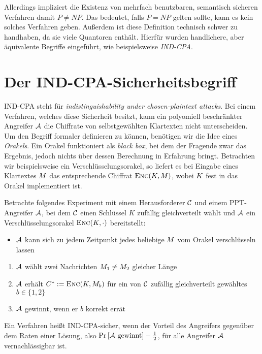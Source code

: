 Allerdings impliziert die Existenz von mehrfach benutzbaren, semantisch sicheren Verfahren damit $P \neq NP$. Das bedeutet, falls $P = NP$ gelten sollte, kann
es kein solches Verfahren geben. Außerdem ist diese Definition technisch schwer zu handhaben, da sie viele Quantoren enthält. Hierfür wurden handlichere, aber äquivalente Begriffe eingeführt, wie beispielsweise \emph{IND-CPA}.

\section{Der IND-CPA-Sicherheitsbegriff}\label{def:ind-cpa}
IND-CPA steht für \emph{indistinguishability under chosen-plaintext attacks}. Bei einem Verfahren, welches diese Sicherheit besitzt, kann ein polyomiell beschränkter Angreifer $\mathcal{A}$ die Chiffrate von selbstgewählten Klartexten nicht unterscheiden. Um den Begriff formaler definieren zu können, benötigen wir die Idee eines \emph{Orakels}. Ein Orakel funktioniert als \emph{black box}, bei dem der Fragende zwar das Ergebnis, jedoch nichts über dessen Berechnung in Erfahrung bringt. Betrachten wir beispielsweise ein Verschlüsselungsorakel, so liefert es bei Eingabe eines Klartextes $M$ das entsprechende Chiffrat $\textsc{Enc}(K, M)$, wobei $K$ fest in das Orakel implementiert ist.
\begin{definition}
	Betrachte folgendes Experiment mit einem Herausforderer $\mathcal{C}$ und einem PPT-Angreifer $\mathcal{A}$, bei dem $\mathcal{C}$ einen Schlüssel $K$ zufällig gleichverteilt wählt und $\mathcal{A}$ ein Verschlüsselungsorakel $\textsc{Enc}(K,\cdot)$ bereitstellt: 
	\begin{itemize}
		\item $\mathcal{A}$ kann sich zu jedem Zeitpunkt jedes beliebige $M$ vom Orakel verschlüsseln lassen
	\end{itemize}
	\begin{enumerate}
		\item $\mathcal{A}$ wählt zwei Nachrichten $M_1 \neq M_2$ gleicher Länge
		\item $\mathcal{A}$ erhält $C^{*} := \textsc{Enc}(K, M_{b})$ für ein von $\mathcal{C}$ zufällig gleichverteilt gewähltes $b \in \{1, 2\}$
		\item $\mathcal{A}$ gewinnt, wenn er $b$ korrekt errät
	\end{enumerate}
	Ein Verfahren heißt IND-CPA-sicher, wenn der Vorteil des Angreifers gegenüber dem Raten einer Lösung, also $\Pr \left[ \mathcal{A} \textnormal{ gewinnt} \right] - \frac{1}{2}$, für alle Angreifer $\mathcal{A}$ vernachlässigbar ist. 
\end{definition}
